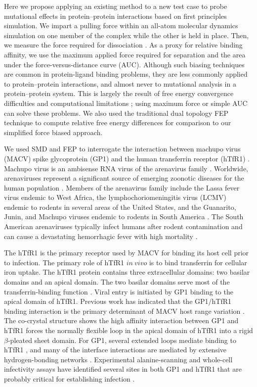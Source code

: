 \documentclass[12pt]{article}
\begin{document}
Here we propose applying an existing method to a new test case to probe mutational effects in protein--protein interactions based on first principles simulation. We impart a pulling force within an all-atom molecular dynamics simulation on one member of the complex while the other is held in place. Then, we measure the force required for dissociation \citep{Gumbart2012,Lu1999,Park2004,Is2001A,Is2001B}. As a proxy for relative binding affinity, we use the maximum applied force required for separation and the area under the force-versus-distance curve (AUC). Although such biasing techniques are common in protein-ligand binding problems, they are less commonly applied to protein--protein interactions, and almost never to mutational analysis in a protein--protein system. This is largely the result of free energy convergence difficulties and computational limitations \citep{Cuendet2008,Cuendet2011}; using maximum force or simple AUC can solve these problems. We also used the traditional dual topology FEP technique to compute relative free energy differences for comparison to our simplified force biased approach.

We used SMD and FEP to interrogate the interaction between machupo virus (MACV) spike glycoprotein (GP1) and the human transferrin receptor (hTfR1) \citep{Abraham2010,Charrel2003}. Machupo virus is an ambisense RNA virus of the arenavirus family \citep{Charrel2003}. Worldwide, arenaviruses represent a significant source of emerging zoonotic diseases for the human population \citep{Charrel2003}. Members of the arenavirus family include the Lassa fever virus endemic to West Africa, the lymphochoriomeningitis virus (LCMV) endemic to rodents in several areas of the United States, and the Guanarito, Junin, and Machupo viruses endemic to rodents in South America \citep{Charrel2003}. The South American arenaviruses typically infect humans after rodent contamination and can cause a devastating hemorrhagic fever with high mortality \citep{Charrel2003}.

The hTfR1 is the primary receptor used by MACV for binding its host cell prior to infection. The primary role of hTfR1 $in~vivo$ is to bind transferrin for cellular iron uptake. The hTfR1 protein contains three extracellular domains: two basilar domains and an apical domain. The two basilar domains serve most of the transferrin-binding function \citep{Abraham2010,Rad20112}. Viral entry is initiated by GP1 binding to the apical domain of hTfR1. Previous work has indicated that the GP1/hTfR1 binding interaction is the primary determinant of MACV host range variation \citep{Rad20111,Rad20112}. The co-crystal structure shows the high affinity interaction between GP1 and hTfR1 forces the normally flexible loop in the apical domain of hTfR1 into a rigid $\beta$-pleated sheet domain. For GP1, several extended loops mediate binding to hTfR1 \citep{Abraham2010,Rad20112}, and many of the interface interactions are mediated by extensive hydrogen-bonding networks \citep{Abraham2010}. Experimental alanine-scanning and whole-cell infectivity assays have identified several sites in both GP1 and hTfR1 that are probably critical for establishing infection \citep{Rad20111,Rad20112}.
\end{document}
